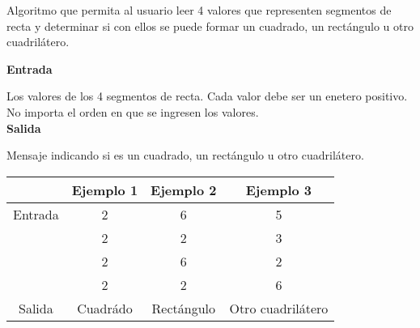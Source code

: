 
\question Algoritmo que permita al usuario leer 4 valores que representen
          segmentos de recta y determinar si con ellos se puede formar un
          cuadrado, un rectángulo u otro cuadrilátero.

\textbf{Entrada}

Los valores de los 4 segmentos de recta. Cada valor debe ser un enetero
positivo. No importa el orden en que se ingresen los valores. \\

\textbf{Salida}

Mensaje indicando si es un cuadrado, un rectángulo u otro cuadrilátero.

\begin{center}
  \begin{tabular}{|c|c|c|c|}
     \hline
     \rowcolor[HTML]{C0C0C0}
             & Ejemplo 1 & Ejemplo 2 & Ejemplo 3 \\
     \hline
     Entrada & 2 &  6  & 5 \\
             & 2 &  2  & 3 \\
             & 2 &  6  & 2 \\
             & 2 &  2  & 6 \\
     \hline
     Salida  & Cuadrádo & Rectángulo & Otro cuadrilátero \\
     \hline
  \end{tabular}
\end{center}
